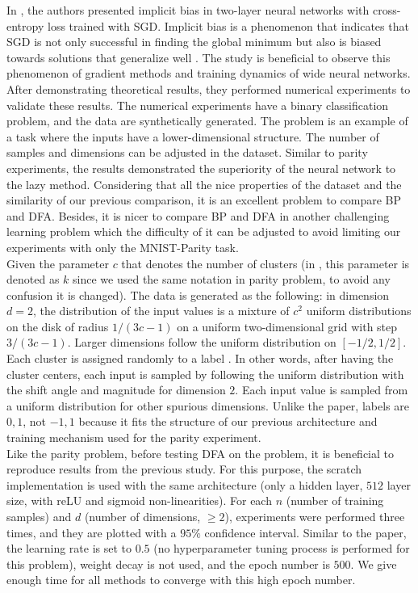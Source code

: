 \documentclass[a4paper, nobind]{templates/ociamthesis}
\begin{document}
In \cite{chizat2020implicit}, the authors presented implicit bias in two-layer neural networks with cross-entropy loss trained with SGD. Implicit bias is a phenomenon that indicates that SGD is not only successful in finding the global minimum but also is biased towards solutions that generalize well \cite{yun2021unifying}. The study is beneficial to observe this phenomenon of gradient methods and training dynamics of wide neural networks. After demonstrating theoretical results, they performed numerical experiments to validate these results. The numerical experiments have a binary classification problem, and the data are synthetically generated. The problem is an example of a task where the inputs have a lower-dimensional structure. The number of samples and dimensions can be adjusted in the dataset. Similar to parity experiments, the results demonstrated the superiority of the neural network to the lazy method. Considering that all the nice properties of the dataset and the similarity of our previous comparison, it is an excellent problem to compare BP and DFA. Besides, it is nicer to compare BP and DFA in another challenging learning problem which the difficulty of it can be adjusted to avoid limiting our experiments with only the MNIST-Parity task.\\
\noindent Given the parameter \(c\) that denotes the number of clusters (in \cite{chizat2020implicit}, this parameter is denoted as \(k\) since we used the same notation in parity problem, to avoid any confusion it is changed). The data is generated as the following: in dimension \(d=2\), the distribution of the input values is a mixture of \(c^2\) uniform distributions on the disk of radius \(1/ (3c-1)\) on a uniform two-dimensional grid with step \(3/(3c-1)\). Larger dimensions follow the uniform distribution on \([-1/2,1/2]\). Each cluster is assigned randomly to a label \cite{chizat2020implicit}. In other words, after having the cluster centers, each input is sampled by following the uniform distribution with the shift angle and magnitude for dimension \(2\). Each input value is sampled from a uniform distribution for other spurious dimensions. Unlike the paper, labels are \(0,1\), not \(-1,1\) because it fits the structure of our previous architecture and training mechanism used for the parity experiment.\\
Like the parity problem, before testing DFA on the problem, it is beneficial to reproduce results from the previous study. For this purpose, the scratch implementation is used with the same architecture (only a hidden layer, \(512\) layer size, with reLU and sigmoid non-linearities). For each \(n\) (number of training samples) and \(d\) (number of dimensions, \(\geq2\)), experiments were performed three times, and they are plotted with a \(95\%\) confidence interval. Similar to the paper, the learning rate is set to \(0.5\) (no hyperparameter tuning process is performed for this problem), weight decay is not used, and the epoch number is \(500\). We give enough time for all methods to converge with this high epoch number.
\end{document}
